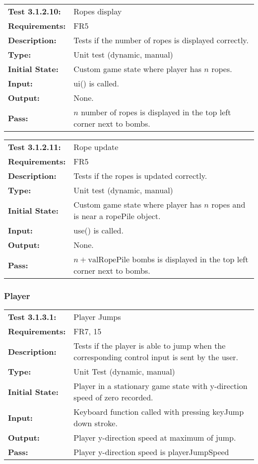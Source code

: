 \documentclass[12pt, titlepage]{article}
\begin{document}
\textcolor{red}{
\begin{tabular}{|l|p{10cm}|}
    \hline
    \bf{Test} 3.1.2.10: & Ropes display \\
    \bf{Requirements}: & FR5 \\
    \bf{Description}: & Tests if the number of ropes is displayed correctly. \\
    \bf{Type}: & Unit test (dynamic, manual) \\
    \bf{Initial State}: & Custom game state where player has $n$ ropes. \\
    \bf{Input}: & ui() is called. \\
    \bf{Output}: & None. \\
    \bf{Pass}: & $n$ number of ropes is displayed in the top left corner next to bombs. \\
    \hline
\end{tabular}
}

\textcolor{red}{
\begin{tabular}{|l|p{10cm}|}
    \hline
    \bf{Test} 3.1.2.11: & Rope update \\
    \bf{Requirements}: & FR5 \\
    \bf{Description}: & Tests if the ropes is updated correctly. \\
    \bf{Type}: & Unit test (dynamic, manual) \\
    \bf{Initial State}: & Custom game state where player has $n$ ropes and is near a ropePile object. \\
    \bf{Input}: & use() is called. \\
    \bf{Output}: & None. \\
    \bf{Pass}: & $n + \text{valRopePile}$ bombs is displayed in the top left corner next to bombs. \\
    \hline
\end{tabular}
}

\subsubsection{Player}

\begin{tabular}{|l|p{10cm}|}
    \hline
    \bf{Test} 3.1.3.1: & Player Jumps\\
    \bf{Requirements}: & FR7, 15\\
    \bf{Description}: &  Tests if the player is able to jump when the corresponding control input is sent by the user.\\
    \bf{Type}: & Unit Test (dynamic, manual) \\
    \bf{Initial State}: & Player in a stationary game state with y-direction speed of zero recorded. \\
    \bf{Input}: & Keyboard function called with pressing keyJump down stroke. \\
    \bf{Output}: & Player y-direction speed at maximum of jump.\\
    \bf{Pass}: & Player y-direction speed is playerJumpSpeed\\  
    \hline
\end{tabular}
\end{document}
